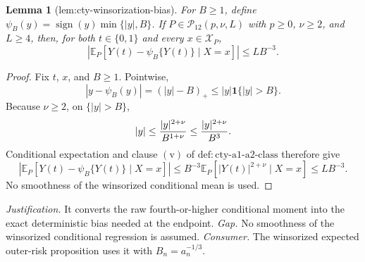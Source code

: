 \documentclass{article}
\newtheorem{lemma}{Lemma}
\begin{document}
\begin{lemma}[lem:cty-winsorization-bias]\label{lem:cty-winsorization-bias}
For \(B\geq1\), define \(\psi_B(y)=\operatorname{sign}(y)\min\{|y|,B\}\).  If \(P\in\mathcal P_{12}(p,\nu,L)\) with \(p\geq0\), \(\nu\geq2\), and \(L\geq4\), then, for both \(t\in\{0,1\}\) and every \(x\in\mathcal X_P\),
\[
 \left|\mathbb E_P\!\left[Y(t)-\psi_B\{Y(t)\}\mid X=x\right]\right|
 \leq L B^{-3}.
\]
\end{lemma}
\begin{proof}
Fix \(t\), \(x\), and \(B\geq1\).  Pointwise,
\[
 |y-\psi_B(y)|=(|y|-B)_+\leq |y|\mathbf1\{|y|>B\}.
\]
Because \(\nu\geq2\), on \(\{|y|>B\}\),
\[
 |y|\leq {|y|^{2+\nu}\over B^{1+\nu}}
 \leq {|y|^{2+\nu}\over B^3}.
\]
Conditional expectation and clause \(\mathrm{(v)}\) of \(\mathrm{def:cty\text{-}a1\text{-}a2\text{-}class}\) therefore give
\[
 \left|\mathbb E_P\!\left[Y(t)-\psi_B\{Y(t)\}\mid X=x\right]\right|
 \leq B^{-3}\mathbb E_P[|Y(t)|^{2+\nu}\mid X=x]
 \leq LB^{-3}.
\]
No smoothness of the winsorized conditional mean is used.
\end{proof}
\par\smallskip\noindent \textit{Justification.} It converts the raw fourth-or-higher conditional moment into the exact deterministic bias needed at the endpoint. \textit{Gap.} No smoothness of the winsorized conditional regression is assumed. \textit{Consumer.} The winsorized expected outer-risk proposition uses it with \(B_n=a_n^{-1/3}\).
\end{document}
